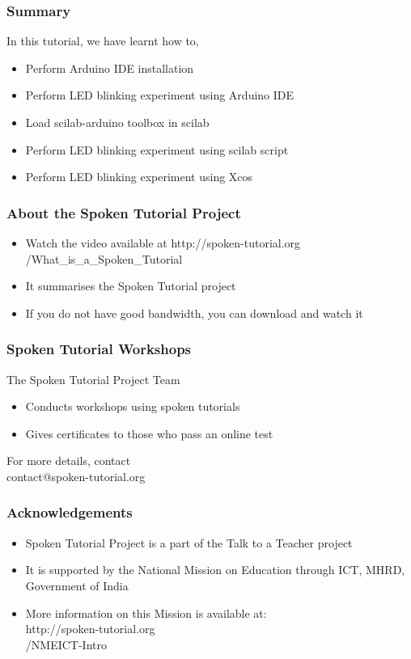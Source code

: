 \documentclass[17pt,xcolor=table]{beamer}
\begin{document}
\begin{frame}[fragile]
\frametitle{Summary}
In this tutorial, we have learnt how to,
\begin{itemize}[<+-|alert@+>]
\item Perform Arduino IDE installation
\item Perform LED blinking experiment using Arduino IDE
\item Load scilab-arduino toolbox in scilab
\item Perform LED blinking experiment using scilab script
\item Perform LED blinking experiment using Xcos
\end{itemize}
\end{frame}

\begin{frame}
\frametitle{About the Spoken Tutorial Project}
\begin{itemize}
\item Watch the video available at {\color{red} http://spoken-tutorial.org /What\_is\_a\_Spoken\_Tutorial}
\item It summarises the Spoken Tutorial project 
\item If you do not have good bandwidth, you can download and watch it
\end{itemize}
\end{frame}

\begin{frame}
\frametitle{Spoken Tutorial Workshops}The Spoken Tutorial Project Team 
\begin{itemize}
\item Conducts workshops using spoken tutorials
\item Gives certificates to those who pass an online test
\end{itemize}
For more details, contact \\ {\color{red}contact@spoken-tutorial.org}

\end{frame}

\begin{frame}
\frametitle{Acknowledgements}
\begin{itemize}
\item Spoken Tutorial Project is a part of the Talk to a Teacher  project
\item It is supported by the National Mission on Education through  ICT, MHRD, Government of India
\item More information on this Mission is available at: \\ {\color{red} http://spoken-tutorial.org \\ /NMEICT-Intro}
\end{itemize}
\end{frame}
\end{document}
